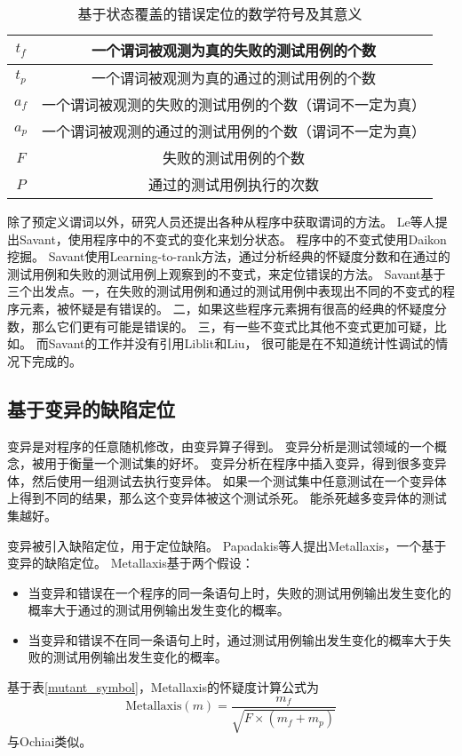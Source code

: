 \begin{table}
\centering
\begin{tabular}{|c|c|}
\hline
$t_f$ & 一个谓词被观测为真的失败的测试用例的个数 \\
\hline
$t_p$ & 一个谓词被观测为真的通过的测试用例的个数 \\
\hline
$a_f$ & 一个谓词被观测的失败的测试用例的个数（谓词不一定为真）\\
\hline
$a_p$ & 一个谓词被观测的通过的测试用例的个数（谓词不一定为真）\\
\hline
$F$ & 失败的测试用例的个数 \\
\hline
$P$ & 通过的测试用例执行的次数 \\
\hline
\end{tabular}
\caption{基于状态覆盖的错误定位的数学符号及其意义}
\label{state_symbol}
\end{table}

除了预定义谓词以外，研究人员还提出各种从程序中获取谓词的方法。
Le等人提出Savant\parencite{Le2016A}，使用程序中的不变式的变化来划分状态。
程序中的不变式使用Daikon\parencite{Ernst2007The}挖掘。
Savant使用Learning-to-rank方法，通过分析经典的怀疑度分数和在通过的测试用例和失败的测试用例上观察到的不变式，来定位错误的方法。
Savant基于三个出发点。一，在失败的测试用例和通过的测试用例中表现出不同的不变式的程序元素，被怀疑是有错误的。
二，如果这些程序元素拥有很高的经典的怀疑度分数，那么它们更有可能是错误的。
三，有一些不变式比其他不变式更加可疑，比如。
而Savant的工作并没有引用Liblit\parencite{Liblit2005Scalable}和Liu\parencite{Liu2006Statistical}，
很可能是在不知道统计性调试的情况下完成的。

\subsection{基于变异的缺陷定位}

变异是对程序的任意随机修改，由变异算子得到。
变异分析是测试领域的一个概念，被用于衡量一个测试集的好坏。
变异分析在程序中插入变异，得到很多变异体，然后使用一组测试去执行变异体。
如果一个测试集中任意测试在一个变异体上得到不同的结果，那么这个变异体被这个测试杀死。
能杀死越多变异体的测试集越好。

变异被引入缺陷定位，用于定位缺陷。
Papadakis等人提出Metallaxis\parencite{Papadakis2015Metallaxis}，一个基于变异的缺陷定位。
Metallaxis基于两个假设：
\begin{itemize}
\item 当变异和错误在一个程序的同一条语句上时，失败的测试用例输出发生变化的概率大于通过的测试用例输出发生变化的概率。
\item 当变异和错误不在同一条语句上时，通过测试用例输出发生变化的概率大于失败的测试用例输出发生变化的概率。
\end{itemize}
基于表\ref{mutant_symbol}，Metallaxis的怀疑度计算公式为
$$
\mathrm{Metallaxis}(m) = \frac{m_f}{\sqrt{F \times (m_f + m_p)}}
$$
与Ochiai类似。

